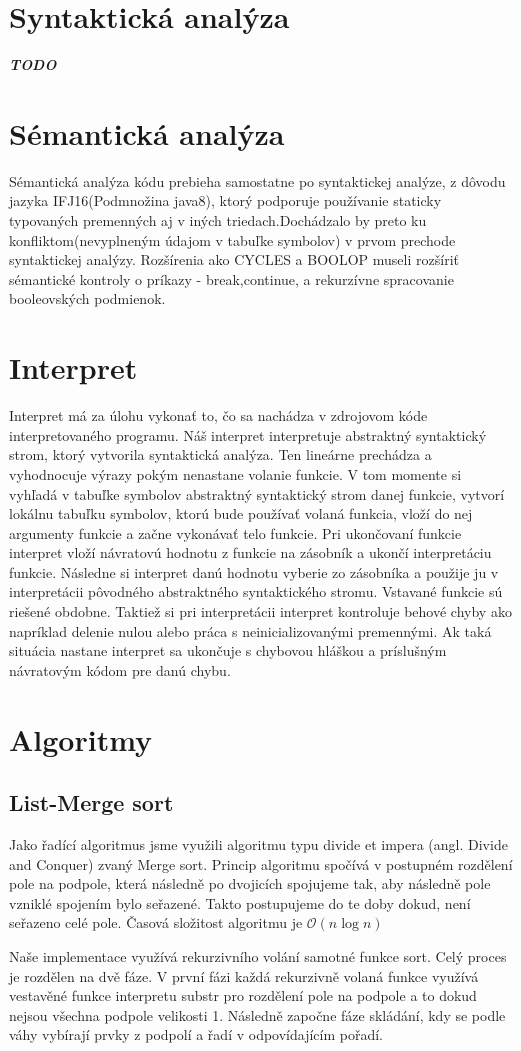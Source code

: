 \documentclass[12pt,a4paper]{report}
\begin{document}
\section{Syntaktická analýza}
\textbf{\textit{TODO}}
\section{Sémantická analýza}
Sémantická analýza kódu prebieha samostatne po syntaktickej analýze, z dôvodu jazyka IFJ16(Podmnožina java8), ktorý podporuje používanie staticky typovaných premenných aj v iných triedach.Dochádzalo by preto ku konfliktom(nevyplneným údajom v tabuľke symbolov) v prvom prechode syntaktickej analýzy. Rozšírenia ako CYCLES a BOOLOP museli rozšíriť sémantické kontroly o príkazy - break,continue, a rekurzívne spracovanie booleovských podmienok.
\section{Interpret}
Interpret má za úlohu vykonať to, čo sa nachádza v zdrojovom kóde interpretovaného programu. Náš interpret interpretuje abstraktný syntaktický strom, ktorý vytvorila syntaktická analýza. Ten lineárne prechádza a vyhodnocuje výrazy pokým nenastane volanie funkcie. V tom momente si vyhľadá v tabuľke symbolov abstraktný syntaktický strom danej funkcie, vytvorí lokálnu tabuľku symbolov, ktorú bude používať volaná funkcia, vloží do nej argumenty funkcie a začne vykonávať telo funkcie. Pri ukončovaní funkcie interpret vloží návratovú hodnotu z funkcie na zásobník a ukončí interpretáciu funkcie. Následne si interpret danú hodnotu vyberie zo zásobníka a použije ju v interpretácii pôvodného abstraktného syntaktického stromu. Vstavané funkcie sú riešené obdobne. Taktiež si pri interpretácii interpret kontroluje behové chyby ako napríklad delenie nulou alebo práca s neinicializovanými premennými. Ak taká situácia nastane interpret sa ukončuje s chybovou hláškou a príslušným návratovým kódom pre danú chybu.


\section{Algoritmy}
\subsection{List-Merge sort}
\par Jako řadící algoritmus jsme využili algoritmu typu divide et impera (angl. Divide and Conquer) zvaný Merge sort. Princip algoritmu spočívá v postupném rozdělení pole na podpole, která následně po dvojicích spojujeme tak, aby následně pole vzniklé spojením bylo seřazené. Takto postupujeme do te doby dokud, není seřazeno celé pole. Časová složitost algoritmu je $\mathcal{O}(n\log{}n)$
\par Naše implementace využívá rekurzivního volání samotné funkce sort. Celý proces je rozdělen na dvě fáze. V první fázi každá rekurzivně volaná funkce využívá vestavěné funkce interpretu substr pro rozdělení pole na podpole a to dokud nejsou všechna podpole velikosti 1. Následně započne fáze skládání, kdy se podle váhy vybírají prvky z podpolí a řadí v odpovídajícím pořadí.
\end{document}
